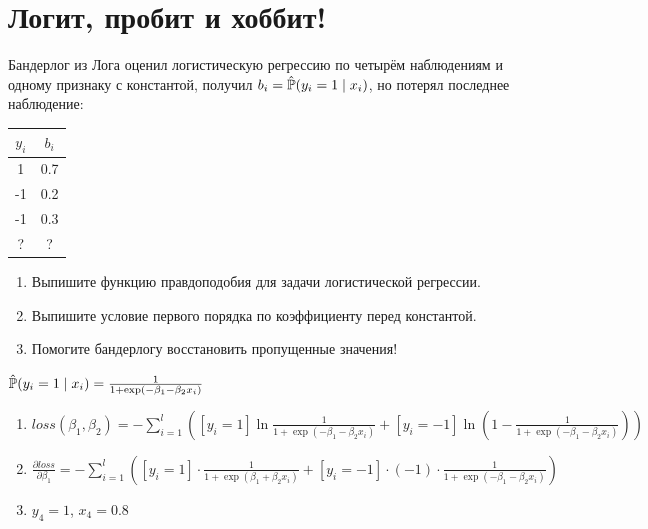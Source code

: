 \section{Логит, пробит и хоббит!}


\begin{problem}
Бандерлог из Лога оценил логистическую регрессию по четырём наблюдениям и одному признаку с константой, 
получил $b_i = \hat\P(y_i = 1 \mid x_i)$, но потерял последнее наблюдение:

\begin{tabular}{cc}
  \toprule
  $y_i$ & $b_i$ \\
  \midrule
  1 & 0.7 \\
  -1 & 0.2 \\
  -1 & 0.3 \\
  ? &  ? \\
  \bottomrule
\end{tabular}

\begin{enumerate}
\item Выпишите функцию правдоподобия для задачи логистической регрессии.
\item Выпишите условие первого порядка по коэффициенту перед константой.
\item Помогите бандерлогу восстановить пропущенные значения!
\end{enumerate}

\begin{sol}
$\hat\P(y_i = 1 \mid x_i) = \frac{1}{1+\exp(-\beta_1 - \beta_2 x_i)}$
\begin{enumerate}
\item $loss(\beta_1, \beta_2) = - \sum_{i=1}^l \left([y_i = 1] \ln  \frac{1}{1+\exp(-\beta_1 - \beta_2 x_i)} + [y_i = -1] \ln \left(1 - \frac{1}{1+\exp(-\beta_1 - \beta_2 x_i)}\right)\right)$
\item $\frac{\partial loss}{\partial \beta_1} = - \sum_{i=1}^l \left([y_i = 1] \cdot \frac{1}{1 + \exp(\beta_1 + \beta_2 x_i)} + [y_i = -1] \cdot (-1) \cdot \frac{1}{1 + \exp(-\beta_1 - \beta_2 x_i)} \right)$
\item $y_4 = 1$, $x_4 = 0.8$
\end{enumerate}
\end{sol}
\end{problem}



